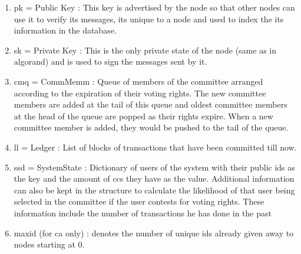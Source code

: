 \begin{enumerate}
    \item pk = Public Key : This key is advertised by the node so that other nodes can use it to verify its messages, its unique to a node and used to index the its information in the database.
    \item sk = Private Key : This is the only private state of the node (same as in algorand) and is used to sign the messages sent by it.
    \item cmq = CommMemm : Queue of members of the committee arranged according to the expiration of their voting rights. The new committee members are added at the tail of this queue and oldest committee members at the head of the queue are popped as their rights expire. When a new committee member is added, they would be pushed to the tail of the queue.
    \item ll = Ledger : List of blocks of transactions that have been committed till now.
    \item ssd = SystemState : Dictionary of users of the system with their public ids as the key and the amount of ccs they have as the value. Additional information can also be kept in the structure to calculate the likelihood of that user being selected in the committee if the user contests for voting rights. These information include the number of transactions he has done in the past
    \item maxid (for ca only) : denotes the number of unique ids already given away to nodes starting at 0.
\end{enumerate}

